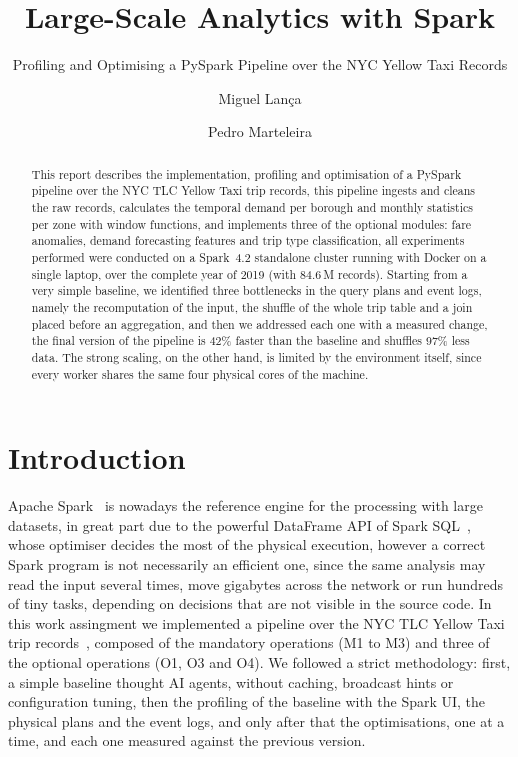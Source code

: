 \documentclass[sigconf]{acmart}
\begin{document}
\title{Large-Scale Analytics with Spark}
\subtitle{Profiling and Optimising a PySpark Pipeline over the NYC Yellow Taxi Records}

\author{Miguel Lan\c{c}a}

\author{Pedro Marteleira}


\begin{abstract}
This report describes the implementation, profiling and optimisation of a PySpark pipeline over
the NYC TLC Yellow Taxi trip records, this pipeline ingests and cleans the raw records, calculates
the temporal demand per borough and monthly statistics per zone with window functions, and
implements three of the optional modules: fare anomalies, demand forecasting features and
trip type classification, all experiments performed were conducted on a Spark~4.2 standalone cluster
running with Docker on a single laptop, over the complete year of 2019 (with 84.6\,M records).
Starting from a very simple baseline, we identified three bottlenecks in the query plans and event
logs, namely the recomputation of the input, the shuffle of the whole trip table and a join placed
before an aggregation, and then we addressed each one with a measured change, the final version of the pipeline is 42\%
faster than the baseline and shuffles 97\% less data. The strong scaling, on the other hand, is
limited by the environment itself, since every worker shares the same four physical cores of the machine.
\end{abstract}



\maketitle
\pagestyle{plain} %

\section{Introduction}

Apache Spark~\cite{zaharia2016spark} is nowadays the reference engine for the processing with
large datasets, in great part due to the powerful DataFrame API of Spark SQL~\cite{armbrust2015sparksql},
whose optimiser decides the most of the physical execution, however a correct Spark program is not
necessarily an efficient one, since the same analysis may read the input several times, move gigabytes
across the network or run hundreds of tiny tasks, depending on decisions that are not visible in
the source code.
In this work assingment we implemented a pipeline over the NYC TLC Yellow Taxi trip records~\cite{tlc},
composed of the mandatory operations (M1 to M3) and three of the optional operations (O1, O3 and O4). We
followed a strict methodology: first, a simple baseline thought AI agents, without caching, broadcast hints or
configuration tuning, then the profiling of the baseline with the Spark UI, the physical plans
and the event logs, and only after that the optimisations, one at a time, and each one measured against
the previous version. 
\end{document}
